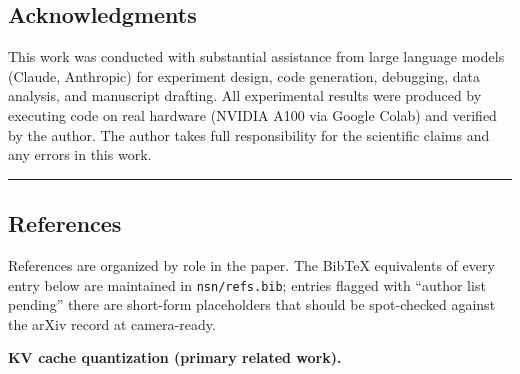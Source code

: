 \subsection{Acknowledgments}\label{acknowledgments}

This work was conducted with substantial assistance from large language
models (Claude, Anthropic) for experiment design, code generation,
debugging, data analysis, and manuscript drafting. All experimental
results were produced by executing code on real hardware (NVIDIA A100
via Google Colab) and verified by the author. The author takes full
responsibility for the scientific claims and any errors in this work.

\begin{center}\rule{0.5\linewidth}{0.5pt}\end{center}

\subsection{References}\label{references}

References are organized by role in the paper. The BibTeX equivalents of
every entry below are maintained in \texttt{nsn/refs.bib}; entries
flagged with ``author list pending'' there are short-form placeholders
that should be spot-checked against the arXiv record at camera-ready.

\textbf{KV cache quantization (primary related work).}

